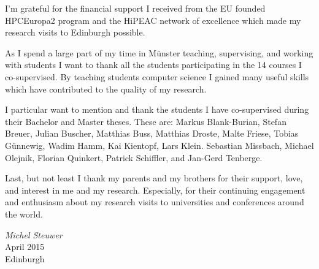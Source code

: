 I'm grateful for the financial support I received from the EU founded HPCEuropa2 program and the HiPEAC network of excellence which made my research visits to Edinburgh possible.

As I spend a large part of my time in M{\"u}nster teaching, supervising, and working with students I want to thank all the students participating in the 14 courses I co-supervised.
By teaching students computer science I gained many useful skills which have contributed to the quality of my research.

I particular want to mention and thank the students I have co-supervised during their Bachelor and Master theses.
These are:
Markus Blank-Burian,
Stefan Breuer,
Julian Buscher,
Matthias Buss,
Matthias Droste,
Malte Friese,
Tobias G{\"u}nnewig,
Wadim Hamm,
Kai Kientopf,
Lars Klein.
Sebastian Missbach,
Michael Olejnik,
Florian Quinkert,
Patrick Schiffler,
and
Jan-Gerd Tenberge.

Last, but not least I thank my parents and my brothers for their support, love, and interest in me and my research.
Especially, for their continuing engagement and enthusiasm about my research visits to universities and conferences around the world.

\bigskip
\begin{flushright}
\emph{Michel Steuwer}\\
April 2015\\
Edinburgh
\end{flushright}


\endgroup

